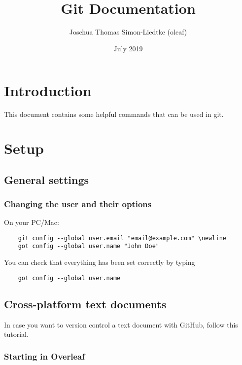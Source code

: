 \documentclass{article}
\title{Git Documentation}
\author{Joschua Thomas Simon-Liedtke (oleaf)}
\date{July 2019}
\begin{document}
\maketitle

\section{Introduction}
This document contains some helpful commands that can be used in git.

\section{Setup}

\subsection{General settings}

\subsubsection{Changing the user and their options}

On your PC/Mac:
\begin{verbatim}
	git config --global user.email "email@example.com" \newline
	got config --global user.name "John Doe"
\end{verbatim}
You can check that everything has been set correctly by typing
\begin{verbatim}
	got config --global user.name
\end{verbatim}


\subsection{Cross-platform text documents}
In case you want to version control a text document with GitHub, follow this tutorial.

\subsubsection{Starting in Overleaf}
\end{document}
